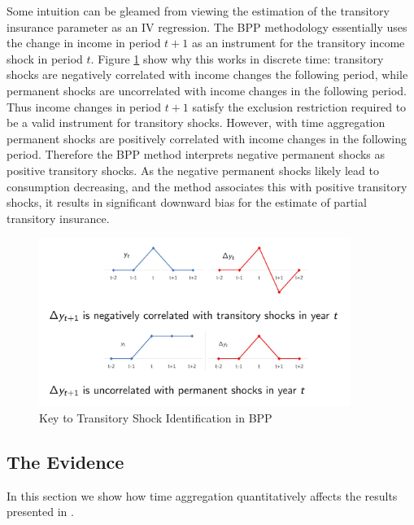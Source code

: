 \documentclass[AER]{AEA}
\begin{document}
Some intuition can be gleamed from viewing the estimation of the transitory insurance parameter as an IV regression. The BPP methodology essentially uses the change in income in period $t+1$ as an instrument for the transitory income shock in period $t$. Figure \ref{fig:BPPidentification} show why this works in discrete time: transitory shocks are negatively correlated with income changes the following period, while permanent shocks are uncorrelated with income changes in the following period. Thus income changes in period $t+1$ satisfy the exclusion restriction required to be a valid instrument for transitory shocks. However, with time aggregation permanent shocks are positively correlated with income changes in the following period. Therefore the BPP method interprets negative permanent shocks as positive transitory shocks. As the negative permanent shocks likely lead to consumption decreasing, and the method associates this with positive transitory shocks, it results in significant downward bias for the estimate of partial transitory insurance.
\begin{figure}
	\includegraphics[width=0.9\textwidth]{BPP_identification.JPG}
	\caption{Key to Transitory Shock Identification in BPP}
	\label{fig:BPPidentification}
\end{figure}

\subsection{The Evidence} \label{evidence}
In this section we show how time aggregation quantitatively affects the results presented in \cite{blundell_consumption_2008}.
\end{document}
